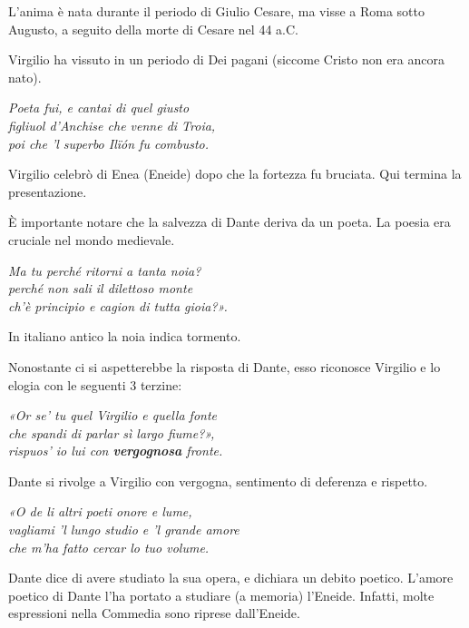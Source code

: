 \documentclass[a4paper]{article}
\newcommand\hr{\par\vspace{-.5\ht\strutbox}\noindent\hrulefill\par\vspace{0.15cm}}
\begin{document}
L'anima è nata durante il periodo di Giulio Cesare, ma visse
a Roma sotto Augusto, a seguito della morte di Cesare nel 44 a.C.

Virgilio ha vissuto in un periodo di Dei pagani (siccome Cristo non era ancora nato).

\begin{center}
    \textit{Poeta fui, e cantai di quel giusto} \\
    \textit{figliuol d'Anchise che venne di Troia,} \\
    \textit{poi che 'l superbo Ilïón fu combusto.}
\end{center}

Virgilio celebrò di Enea (Eneide) dopo che la fortezza fu bruciata.
Qui termina la presentazione.

È importante notare che la salvezza di Dante deriva da un poeta.
La poesia era cruciale nel mondo medievale.

\begin{center}
    \textit{Ma tu perché ritorni a tanta noia?} \\
    \textit{perché non sali il dilettoso monte} \\
    \textit{ch'è principio e cagion di tutta gioia?».}
\end{center}

In italiano antico la noia indica tormento.

\hr

Nonostante ci si aspetterebbe la risposta di Dante, esso
riconosce Virgilio e lo elogia con le seguenti 3 terzine:

\begin{center}
    \textit{«Or se' tu quel Virgilio e quella fonte} \\
    \textit{che spandi di parlar sì largo fiume?»,} \\
    \textit{rispuos' io lui con \textbf{vergognosa} fronte.}
\end{center}

Dante si rivolge a Virgilio con vergogna, sentimento di deferenza e rispetto.

\begin{center}
    \textit{«O de li altri poeti onore e lume,} \\
    \textit{vagliami 'l lungo studio e 'l grande amore} \\
    \textit{che m'ha fatto cercar lo tuo volume.}
\end{center}

Dante dice di avere studiato la sua opera, e dichiara un debito poetico.
L'amore poetico di Dante l'ha portato a studiare (a memoria) l'Eneide.
Infatti, molte espressioni nella Commedia sono riprese dall'Eneide.
\end{document}
